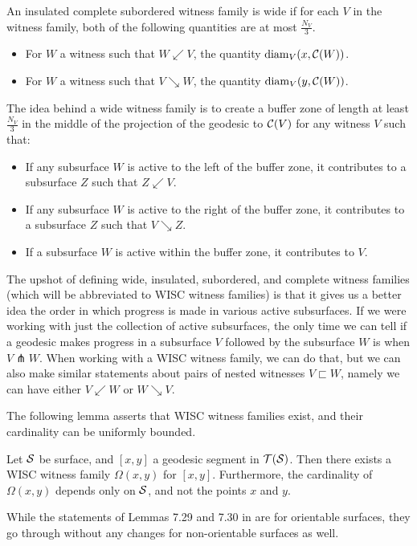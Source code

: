 \documentclass[12pt, reqno]{amsart}
\begin{document}
  \begin{definition}
    An insulated complete subordered witness family is wide if for each $V$ in the witness family, both of the following quantities are at most $\frac{N_V}{3}$.
    \begin{itemize}
    \item For $W$ a witness such that $W \swarrow V$, the quantity $\mathrm{diam}_V(x, \mathcal{C}(W))$.
    \item For $W$ a witness such that $V \searrow W$, the quantity $\mathrm{diam}_V(y, \mathcal{C}(W))$.
    \end{itemize}
  \end{definition}

  The idea behind a wide witness family is to create a buffer zone of length at least $\frac{N_V}{3}$ in the middle of the projection of the geodesic to $\mathcal{C}(V)$ for any witness $V$ such that:
  \begin{itemize}
  \item If any subsurface $W$ is active to the left of the buffer zone, it contributes to a subsurface $Z$ such that $Z \swarrow V$.
  \item If any subsurface $W$ is active to the right of the buffer zone, it contributes to a subsurface $Z$ such that $V \searrow Z$.
  \item If a subsurface $W$ is active within the buffer zone, it contributes to $V$.
  \end{itemize}

  The upshot of defining wide, insulated, subordered, and complete witness families (which will be abbreviated to WISC witness families) is that it gives us a better idea the order in which progress is made in various active subsurfaces.
  If we were working with just the collection of active subsurfaces, the only time we can tell if a geodesic makes progress in a subsurface $V$ followed by the subsurface $W$ is when $V \pitchfork W$.
  When working with a WISC witness family, we can do that, but we can also make similar statements about pairs of nested witnesses $V \sqsubset W$, namely we can have either $V \swarrow W$ or $W \searrow V$.

  The following lemma asserts that WISC witness families exist, and their cardinality can be uniformly bounded.
  \begin{lemma}
    Let $\mathcal{S}$ be surface, and $[x,y]$ a geodesic segment in $\mathcal{T}(\mathcal{S})$.
    Then there exists a WISC witness family $\Omega(x,y)$ for $[x,y]$.
    Furthermore, the cardinality of $\Omega(x,y)$ depends only on $\mathcal{S}$, and not the points $x$ and $y$.
  \end{lemma}
  \begin{rem}
    While the statements of Lemmas 7.29 and 7.30 in \textcite{dowdall2023lattice} are for orientable surfaces, they go through without any changes for non-orientable surfaces as well.
  \end{rem}
\end{document}
